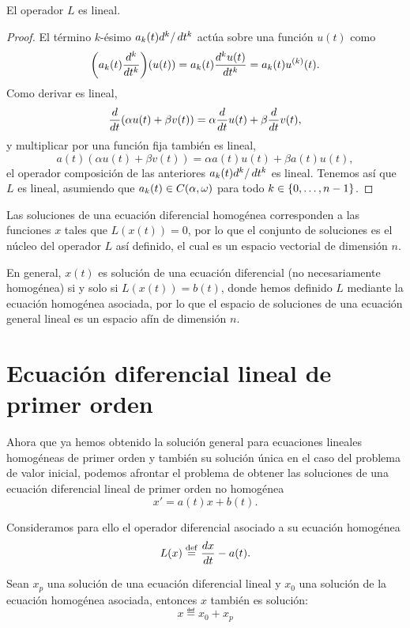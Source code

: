 \documentclass[../ecuaciones_diferenciales.tex]{subfiles}
\begin{document}
\begin{proposition}
	El operador \(L\) es lineal.
\end{proposition}

\begin{proof}
	El término \(k\)-ésimo \(a_k(t) d^k/\mathop{d\!} t^k\) actúa sobre una
	función \(u(t)\) como
	\[\left(a_k(t)\frac{d^k}{\dif t^k}\right)(u(t)) = a_k(t)
		\frac{d^k u(t)}{\dif t^k} = a_k(t) u^{(k)}(t).\]
	Como derivar es lineal,
	\[\frac{d}{\mathop{d\!} t} (\alpha u(t) + \beta v(t))
		= \alpha \frac{d}{\mathop{d\!} t} u(t) + \beta \frac{d}{\mathop{d\!} t} v(t),\]
	y multiplicar por una función fija también es lineal,
	\[a(t)(\alpha u(t) + \beta v(t)) = \alpha a(t) u(t) + \beta a(t) u(t),\]
	el operador composición de las anteriores \(a_k(t) d^k/\mathop{d\!} t^k\) es
	lineal. Tenemos así que \(L\) es lineal, asumiendo que
	\(a_k(t) \in C\openopen{\alpha}{\omega}\) para todo \(k \in \set{0, \dots, n-1}\).
\end{proof}

Las soluciones de una ecuación diferencial homogénea corresponden a las
funciones \(x\) tales que \(L(x(t)) = 0\), por lo que el conjunto de
soluciones es el núcleo del operador \(L\) así definido, el cual es un
espacio vectorial de dimensión \(n\).

En general, \(x(t)\) es solución de una ecuación diferencial (no
necesariamente homogénea) si y solo si \(L(x(t)) = b(t)\), donde hemos
definido \(L\) mediante la ecuación homogénea asociada, por lo que el
espacio de soluciones de una ecuación general lineal es un espacio afín de
dimensión \(n\).

\section{Ecuación diferencial lineal de primer orden}

Ahora que ya hemos obtenido la solución general para
ecuaciones lineales homogéneas de primer orden y también su solución única en el
caso del problema de valor inicial, podemos afrontar el
problema de obtener las soluciones de una ecuación diferencial lineal de primer
orden no homogénea
\[x' = a(t)x + b(t).\]

Consideramos para ello el operador diferencial asociado a su ecuación homogénea
\[L(x) \overset{\operatorname{def}}{=} \frac{dx}{\mathop{d\!} t} - a(t).\]

\begin{lemma}
	Sean \(x_p\) una solución de una ecuación diferencial lineal y \(x_0\) una
	solución de la ecuación homogénea asociada, entonces \(x\) también es
	solución:
	\[x \eqdef x_0 + x_p\] 
\end{lemma}
\end{document}
